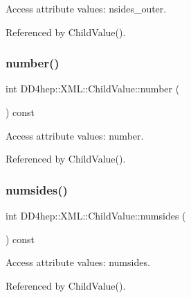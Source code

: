 Access attribute values\+: nsides\+\_\+outer. 



Referenced by Child\+Value().

\hypertarget{struct_d_d4hep_1_1_x_m_l_1_1_child_value_a975a0b542b943525a998d06c219adb12}{}\label{struct_d_d4hep_1_1_x_m_l_1_1_child_value_a975a0b542b943525a998d06c219adb12} 
\subsubsection{\texorpdfstring{number()}{number()}}
{\footnotesize\ttfamily int D\+D4hep\+::\+X\+M\+L\+::\+Child\+Value\+::number (\begin{DoxyParamCaption}{ }\end{DoxyParamCaption}) const}



Access attribute values\+: number. 



Referenced by Child\+Value().

\hypertarget{struct_d_d4hep_1_1_x_m_l_1_1_child_value_a34c77e7c81966b1421f32e58978931ae}{}\label{struct_d_d4hep_1_1_x_m_l_1_1_child_value_a34c77e7c81966b1421f32e58978931ae} 
\subsubsection{\texorpdfstring{numsides()}{numsides()}}
{\footnotesize\ttfamily int D\+D4hep\+::\+X\+M\+L\+::\+Child\+Value\+::numsides (\begin{DoxyParamCaption}{ }\end{DoxyParamCaption}) const}



Access attribute values\+: numsides. 



Referenced by Child\+Value().

\hypertarget{struct_d_d4hep_1_1_x_m_l_1_1_child_value_a106df993449abf245551b83793482433}{}\label{struct_d_d4hep_1_1_x_m_l_1_1_child_value_a106df993449abf245551b83793482433} 
